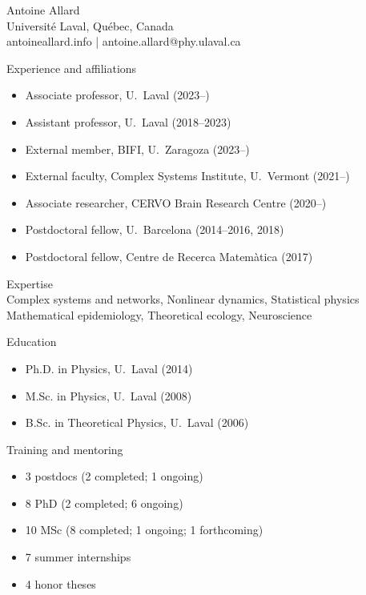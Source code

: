 \documentclass[10pt]{article}
\begin{document}
%
\thispagestyle{empty}
%
\color{font}
%
\begin{center}
  {\LARGE Antoine Allard}\vspace{0.25\baselineskip}\\
  {\color{mongris}Université Laval, Québec, Canada}\\
  {\color{mongris}antoineallard.info | antoine.allard@phy.ulaval.ca}
\end{center}
\vspace*{0.5\baselineskip}
\begin{minipage}[t]{0.56\textwidth}
  {\large\color{monbleu}Experience and affiliations}
  \begin{itemize}
    \item Associate professor, U.~Laval (2023--\quad)
    \item Assistant professor, U.~Laval (2018--2023)
    \item External member, BIFI, U.~Zaragoza (2023--\quad)
    \item External faculty, Complex Systems Institute, U.~Vermont (2021--\quad)
    \item Associate researcher, CERVO Brain Research Centre (2020--\quad)
    \item Postdoctoral fellow, U.~Barcelona (2014--2016, 2018)
    \item Postdoctoral fellow, Centre de Recerca Matemàtica (2017)
  \end{itemize}
  \vspace*{0.5\baselineskip}
  {\large\color{monbleu}Expertise}\\
  Complex systems and networks, Nonlinear dynamics, Statistical physics\\
  Mathematical epidemiology, Theoretical ecology, Neuroscience
\end{minipage}
\hfill
\begin{minipage}[t]{0.42\textwidth}
  {\large\color{monbleu}Education}
  \begin{itemize}
    \item Ph.D. in Physics, U.~Laval (2014)
    \item M.Sc. in Physics, U.~Laval (2008)
    \item B.Sc. in Theoretical Physics, U.~Laval (2006)
  \end{itemize}
  \vspace*{1.5\baselineskip}
  {\large\color{monbleu}Training and mentoring}
  \begin{itemize}
    \item 3 postdocs (2 completed; 1 ongoing)
    \item 8 PhD (2 completed; 6 ongoing)
    \item 10 MSc (8 completed; 1 ongoing; 1 forthcoming)
    \item 7 summer internships
    \item 4 honor theses
  \end{itemize}
\end{minipage}
\end{document}
